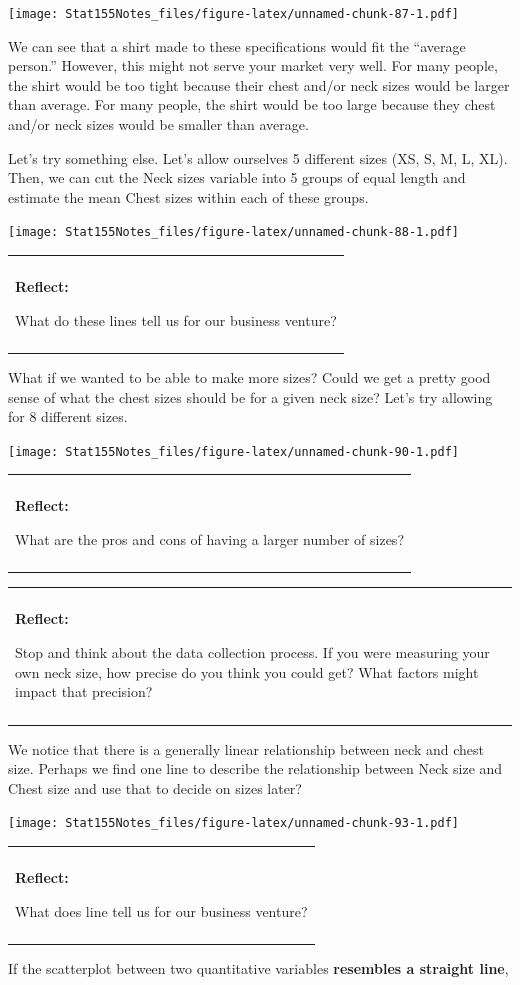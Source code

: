 \documentclass[]{book}
\newenvironment{reflect}
{
    \begin{center}
    
    \begin{tabular}{|p{0.8\textwidth}|}
    \rowcolor{LightBlue}
    \hline\\
    \rowcolor{LightBlue}
    \textbf{Reflect:}
}
{
    \\\rowcolor{LightBlue}
    \\\hline
    \end{tabular} 
    \end{center}
}
\begin{document}
\texttt{[image: Stat155Notes\_files/figure-latex/unnamed-chunk-87-1.pdf]}

We can see that a shirt made to these specifications would fit the ``average person.'' However, this might not serve your market very well. For many people, the shirt would be too tight because their chest and/or neck sizes would be larger than average. For many people, the shirt would be too large because they chest and/or neck sizes would be smaller than average.

Let's try something else. Let's allow ourselves 5 different sizes (XS, S, M, L, XL). Then, we can cut the Neck sizes variable into 5 groups of equal length and estimate the mean Chest sizes within each of these groups.

\texttt{[image: Stat155Notes\_files/figure-latex/unnamed-chunk-88-1.pdf]}

\begin{reflect}
What do these lines tell us for our business venture?
\end{reflect}

What if we wanted to be able to make more sizes? Could we get a pretty good sense of what the chest sizes should be for a given neck size? Let's try allowing for 8 different sizes.

\texttt{[image: Stat155Notes\_files/figure-latex/unnamed-chunk-90-1.pdf]}

\begin{reflect}
What are the pros and cons of having a larger number of sizes?
\end{reflect}

\begin{reflect}
Stop and think about the data collection process. If you were measuring
your own neck size, how precise do you think you could get? What factors
might impact that precision?
\end{reflect}

We notice that there is a generally linear relationship between neck and chest size. Perhaps we find one line to describe the relationship between Neck size and Chest size and use that to decide on sizes later?

\texttt{[image: Stat155Notes\_files/figure-latex/unnamed-chunk-93-1.pdf]}

\begin{reflect}
What does line tell us for our business venture?
\end{reflect}

If the scatterplot between two quantitative variables \textbf{resembles a straight line},
\end{document}
